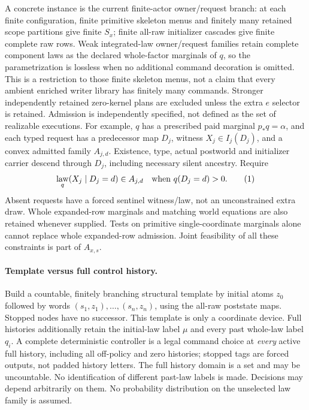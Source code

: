 \documentclass[11pt]{article}
\begin{document}
A concrete instance is the current finite-actor owner/request branch: at each finite configuration, finite primitive skeleton menus and finitely many retained scope partitions give finite $S_x$; finite all-raw initializer cascades give finite complete raw rows. Weak integrated-law owner/request families retain complete component laws as the declared whole-factor marginals of $q$, so the parametrization is lossless when no additional command decoration is omitted. This is a restriction to those finite skeleton menus, not a claim that every ambient enriched writer library has finitely many commands. Stronger independently retained zero-kernel plans are excluded unless the extra $e$ selector is retained. Admission is independently specified, not defined as the set of realizable executions. For example, $q$ has a prescribed paid marginal $p_*q=\alpha$, and each typed request has a predecessor map $D_j$, witness $X_j\in I_j(D_j)$, and a convex admitted family $A_{j,d}$. Existence, type, actual postworld and initializer carrier descend through $D_j$, including necessary silent ancestry. Require
\[
 \mathop{\rm law}_q(X_j\mid D_j=d)\in A_{j,d}
 \quad\text{when }q(D_j=d)>0.                       \tag{1}
\]
Absent requests have a forced sentinel witness/law, not an unconstrained extra draw. Whole expanded-row marginals and matching world equations are also retained whenever supplied. Tests on primitive single-coordinate marginals alone cannot replace whole expanded-row admission. Joint feasibility of all these constraints is part of $A_{x,s}$.

\paragraph{Template versus full control history.}
Build a countable, finitely branching structural template by initial atoms $z_0$ followed by words $(s_1,z_1),\ldots,(s_n,z_n)$, using the all-raw poststate maps. Stopped nodes have no successor. This template is only a coordinate device. Full histories additionally retain the initial-law label $\mu$ and every past whole-law label $q_i$. A complete deterministic controller is a legal command choice at \emph{every} active full history, including all off-policy and zero histories; stopped tags are forced outputs, not padded history letters. The full history domain is a set and may be uncountable. No identification of different past-law labels is made. Decisions may depend arbitrarily on them. No probability distribution on the unselected law family is assumed.
\end{document}
